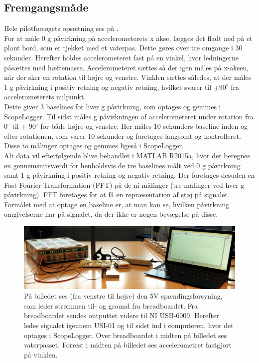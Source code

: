\subsection{Fremgangsmåde}
Hele pilotforsøgets opsætning ses på . \\
For at måle 0 g påvirkning på accelerometerets x akse, lægges det fladt ned på et plant bord, som er tjekket med et vaterpas. Dette gøres over tre omgange i 30 sekunder. Herefter holdes accelerometeret fast på en vinkel, hvor ledningerne påsættes med hæftemasse. Accelerometeret sættes så der igen måles på x-aksen, når der sker en rotation til højre og venstre. Vinklen sættes således, at der måles 1 g påvirkning i positiv retning og negativ retning, hvilket svarer til $\pm 90^{\circ}$ fra accelerometerets nulpunkt. \\
Dette giver 3 baselines for hver g påvirkning, som optages og gemmes i ScopeLogger. %
Til sidst måles g påvirkningen af accelerometeret under rotation fra $0^{\circ}$ til $\pm$ $90^{\circ}$ for både højre og venstre. Her måles 10 sekunders baseline inden og efter rotationen, som varer 10 sekunder og foretages langsomt og kontrolleret. Disse to målinger optages og gemmes ligeså i ScopeLogger. \\
Alt data vil efterfølgende blive behandlet i MATLAB R2015a, hvor der beregnes en gennemsnitsværdi for henholdsvis de tre baselines målt ved 0 g påvirkning samt 1 g påvirkning i positiv retning og negativ retning. Der foretages desuden en Fast Fourier Transformation (FFT) på de ni målinger (tre målinger ved hver g påvirkning). FFT foretages for at få en repræsentation af støj på signalet. Formålet med at optage en baseline er, at man kan se, hvilken påvirkning omgivelserne har på signalet, da der ikke er nogen bevægelse på disse.

\begin{figure}[H]
	\centering
	\includegraphics[scale=0.14]{figures/cProblemloesning/Pilotforsoeg1_2.jpg}
	\caption{På billedet ses (fra venstre til højre) den 5V spændingsforsyning, som leder strømmen til- og ground fra breadboardet. Fra breadboardet sendes outputtet videre til NI USB-6009. Herefter ledes signalet igennem USI-01 og til sidst ind i computeren, hvor det optages i ScopeLogger. Over breadboardet i midten på billedet ses vaterpasset. Forrest i midten på billedet ses accelerometret fastgjort på vinklen.}
	\label{pforsoeg2}
\end{figure}

